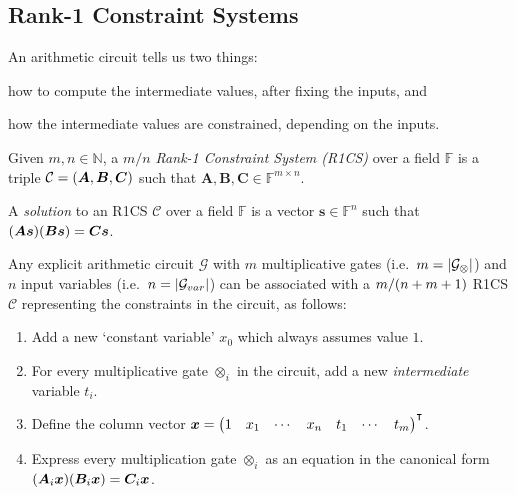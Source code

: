 \subsection{Rank-1 Constraint Systems}
An arithmetic circuit tells us two things:
\begin{enumerate*}[label=(\roman*)] %
  \item how to compute the intermediate values, after fixing the inputs, and
  \item  how the intermediate values are constrained, depending on the inputs.
\end{enumerate*}   
\begin{definition}
	Given \(m,n \in \mathbb{N}\), a \emph{\(m/n\) Rank-1 Constraint System (R1CS)} over a field 
	\(\mathbb{F}\) is a triple \(\mathcal{C} = \left(\bm{A}, \bm{B}, \bm{C}\right)\) such that 
  \(\bm{A}, \bm{B}, \bm{C} \in \mathbb{F}^{m \times n}\).
\end{definition}
\begin{definition}[R1CS solution]
  A \emph{solution} to an R1CS \(\mathcal{C}\) over a field \(\mathbb{F}\) is a vector 
  \(\bm{s} \in \mathbb{F}^n\) such that 
  \(\Parens*{\bm{A}\bm{s}}\Parens*{\bm{B}\bm{s}} = \bm{C}\bm{s}\).
\end{definition}
Any explicit arithmetic circuit \(\mathcal{G}\) with \(m\) multiplicative gates 
(i.e.\  \(m = \left\lvert\mathcal{G}_{\otimes}\right\rvert\)) and \(n\) input variables 
(i.e.\ \(n = \left\lvert\mathcal{G}_{var}\right\rvert\)) can be associated with a 
\({m}/\Parens*{n+m+1}\) 
R1CS \(\mathcal{C}\) representing the constraints in the circuit, as follows:
\begin{enumerate}
	\item Add a new `constant variable' \(x_0\) which always assumes value \(1\).
	\item For every multiplicative gate \(\otimes_i \) in the circuit, add a new \emph{intermediate}
	      variable \(t_i\). 
	\item Define the column vector
	      \(\bm{x} = {\begin{pmatrix}1 & x_1 & \cdots & x_n & t_1 & \cdots & t_m \end{pmatrix}}^\transpose \).
	\item Express every multiplication gate \(\otimes_i \) as an equation in the canonical form
	      \(\Parens*{\bm{A}_i\bm{x}}\Parens*{\bm{B}_i\bm{x}} = \bm{C}_i\bm{x}\).
\end{enumerate}

